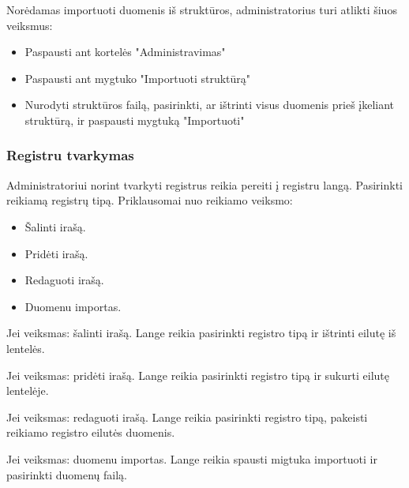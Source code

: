 
	Norėdamas importuoti duomenis iš struktūros, administratorius turi atlikti šiuos veiksmus:
	\begin{itemize}
		\item Paspausti ant kortelės "Administravimas" 
		\item Paspausti ant mygtuko "Importuoti struktūrą" 
		\item Nurodyti struktūros failą, pasirinkti, ar ištrinti visus duomenis prieš įkeliant struktūrą, ir paspausti mygtuką "Importuoti" 
	\end{itemize}

	\subsubsection{Registru tvarkymas}

	Administratoriui norint tvarkyti registrus reikia pereiti į registru langą. Pasirinkti reikiamą registrų tipą. 
	Priklausomai nuo reikiamo veiksmo:
	
	\begin{itemize}
		\item Šalinti irašą.
		\item Pridėti irašą.
		\item Redaguoti irašą.
		\item Duomenu importas.
	\end{itemize}
	
	
	Jei veiksmas: šalinti irašą. Lange  reikia pasirinkti registro tipą ir ištrinti eilutę iš lentelės.

	Jei veiksmas: pridėti irašą. Lange  reikia pasirinkti registro tipą ir sukurti eilutę lentelėje.

	Jei veiksmas: redaguoti irašą. Lange  reikia pasirinkti registro tipą, pakeisti reikiamo registro eilutės duomenis.

	Jei veiksmas: duomenu importas. Lange  reikia spausti migtuka importuoti ir pasirinkti duomenų failą.


